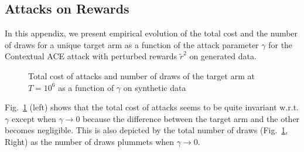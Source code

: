 \subsection{Attacks on Rewards}\label{app:additional_fig_rwds}
In this appendix, we present empirical evolution of the total cost and the number of draws for a unique target arm as a function of the attack parameter $\gamma$ for the Contextual ACE attack with perturbed rewards $\tilde{r}^{2}$ on generated data.

\begin{figure}[htbp]
    \centering
    \caption{Total cost of attacks and number of draws of the target arm at $T = 10^{6}$ as a function of $\gamma$ on synthetic data}
    \label{fig:synth_cost_draws_gamma}
\end{figure}

Fig.~\ref{fig:synth_cost_draws_gamma} (left) shows that the total cost of attacks seems to be quite invariant w.r.t.  $\gamma$ except when $\gamma \rightarrow 0$ because the difference between the target arm and the other becomes negligible. This is also depicted by the total number of draws (Fig.~\ref{fig:synth_cost_draws_gamma}, Right) as the number of draws plummets when $\gamma \rightarrow 0$.

